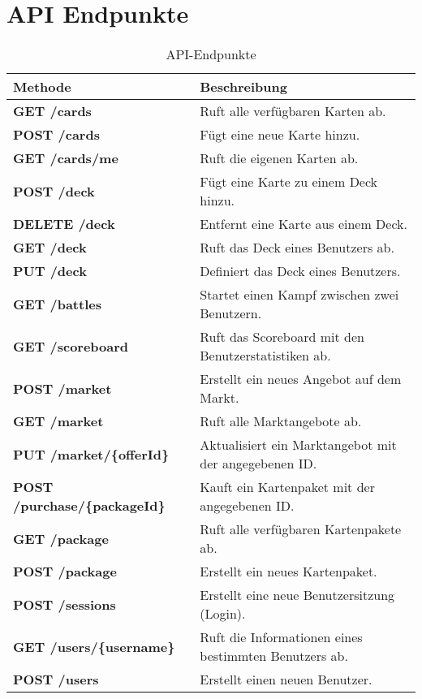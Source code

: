 \documentclass{article}
\begin{document}
\section{API Endpunkte}
\begin{table}[h]
    \centering
    \begin{tabular}{|l|l|}
        \hline
        \textbf{Methode} & \textbf{Beschreibung} \\ \hline
        \textbf{GET /cards} & Ruft alle verfügbaren Karten ab. \\ \hline
        \textbf{POST /cards} & Fügt eine neue Karte hinzu. \\ \hline
        \textbf{GET /cards/me} & Ruft die eigenen Karten ab. \\ \hline
        \textbf{POST /deck} & Fügt eine Karte zu einem Deck hinzu. \\ \hline
        \textbf{DELETE /deck} & Entfernt eine Karte aus einem Deck. \\ \hline
        \textbf{GET /deck} & Ruft das Deck eines Benutzers ab. \\ \hline
        \textbf{PUT /deck} & Definiert das Deck eines Benutzers. \\ \hline
        \textbf{GET /battles} & Startet einen Kampf zwischen zwei Benutzern. \\ \hline
        \textbf{GET /scoreboard} & Ruft das Scoreboard mit den Benutzerstatistiken ab. \\ \hline
        \textbf{POST /market} & Erstellt ein neues Angebot auf dem Markt. \\ \hline
        \textbf{GET /market} & Ruft alle Marktangebote ab. \\ \hline
        \textbf{PUT /market/\{offerId\}} & Aktualisiert ein Marktangebot mit der angegebenen ID. \\ \hline
        \textbf{POST /purchase/\{packageId\}} & Kauft ein Kartenpaket mit der angegebenen ID. \\ \hline
        \textbf{GET /package} & Ruft alle verfügbaren Kartenpakete ab. \\ \hline
        \textbf{POST /package} & Erstellt ein neues Kartenpaket. \\ \hline
        \textbf{POST /sessions} & Erstellt eine neue Benutzersitzung (Login). \\ \hline
        \textbf{GET /users/\{username\}} & Ruft die Informationen eines bestimmten Benutzers ab. \\ \hline
        \textbf{POST /users} & Erstellt einen neuen Benutzer. \\ \hline
    \end{tabular}
    \caption{API-Endpunkte}
    \label{tab:api_endpoints}
\end{table}
\end{document}
